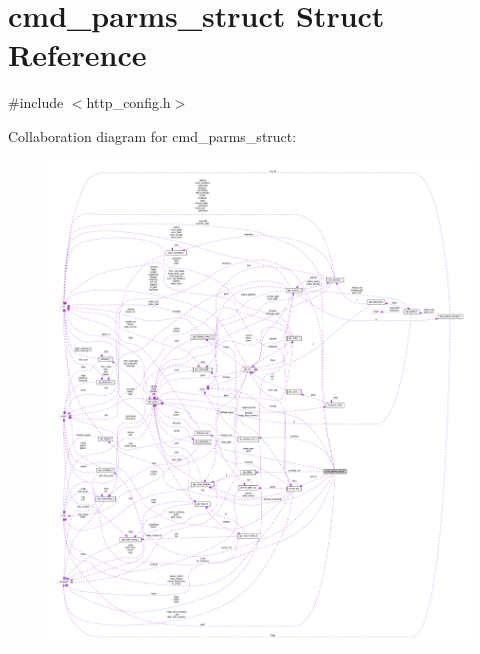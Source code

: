 \hypertarget{structcmd__parms__struct}{}\section{cmd\+\_\+parms\+\_\+struct Struct Reference}
\label{structcmd__parms__struct}


{\ttfamily \#include $<$http\+\_\+config.\+h$>$}



Collaboration diagram for cmd\+\_\+parms\+\_\+struct\+:
\nopagebreak
\begin{figure}[H]
\begin{center}
\leavevmode
\includegraphics[width=350pt]{structcmd__parms__struct__coll__graph}
\end{center}
\end{figure}
